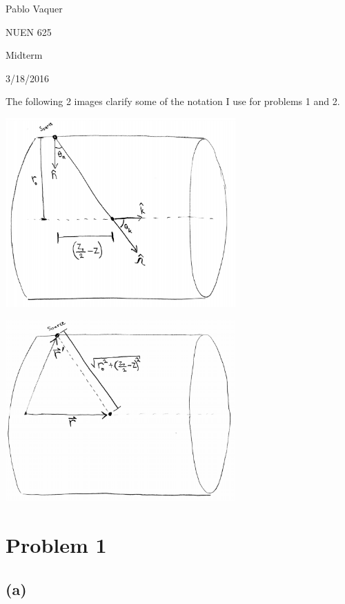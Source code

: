 \documentclass{article}
\begin{document}
\begin{flushright}
Pablo Vaquer

NUEN 625 

Midterm

3/18/2016

\end{flushright}

The following 2 images clarify some of the notation I use for problems 1 and 2.

\begin{center}
\includegraphics[width=0.66\textwidth]{midterm1.png}
\end{center}

\vspace{1cm}

\begin{center}
\includegraphics[width=0.66\textwidth]{midterm2.png}
\end{center}

\pagebreak

\section*{Problem 1}
\subsection*{(a)}
\end{document}
